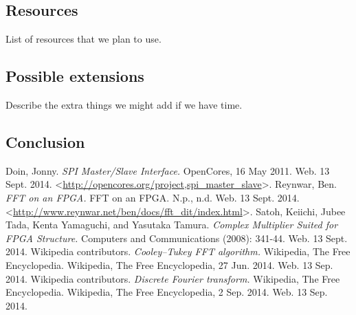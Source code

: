\documentclass[12pt]{article}
\begin{document}
  \subsection*{Resources}
    List of resources that we plan to use.
  \subsection*{Possible extensions}
    Describe the extra things we might add if we have time.
  \subsection*{Conclusion}

  \begin{thebibliography}{9}
      Doin, Jonny. \emph{SPI Master/Slave Interface.} OpenCores, 16 May 2011. Web. 13 Sept. 2014. \textless\url{http://opencores.org/project,spi_master_slave}\textgreater.
      Reynwar, Ben. \emph{FFT on an FPGA.} FFT on an FPGA. N.p., n.d. Web. 13 Sept. 2014. \textless\url{http://www.reynwar.net/ben/docs/fft_dit/index.html}\textgreater.
      Satoh, Keiichi, Jubee Tada, Kenta Yamaguchi, and Yasutaka Tamura. \emph{Complex Multiplier Suited for FPGA Structure.} Computers and Communications (2008): 341-44. Web. 13 Sept. 2014.
      Wikipedia contributors. \emph{Cooley–Tukey FFT algorithm.} Wikipedia, The Free Encyclopedia. Wikipedia, The Free Encyclopedia, 27 Jun. 2014. Web. 13 Sep. 2014.
      Wikipedia contributors. \emph{Discrete Fourier transform.} Wikipedia, The Free Encyclopedia. Wikipedia, The Free Encyclopedia, 2 Sep. 2014. Web. 13 Sep. 2014.
  \end{thebibliography}
\end{document}
